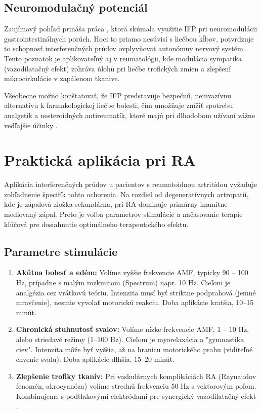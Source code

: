 \subsection{Neuromodulačný potenciál}
Zaujímavý pohľad prináša práca \textcite{Moore2018}, ktorá skúmala využitie IFP pri neuromodulácii gastrointestinálnych porúch. Hoci to priamo nesúvisí s liečbou kĺbov, potvrdzuje to schopnosť interferenčných prúdov ovplyvňovať autonómny nervový systém. Tento poznatok je aplikovateľný aj v reumatológii, kde modulácia sympatika (vazodilatačný efekt) zohráva úlohu pri liečbe trofických zmien a zlepšení mikrocirkulácie v zapálenom tkanive.

Všeobecne možno konštatovať, že IFP predstavuje bezpečnú, neinvazívnu alternatívu k farmakologickej liečbe bolesti, čím umožňuje znížiť spotrebu analgetík a nesteroidných antireumatík, ktoré majú pri dlhodobom užívaní vážne vedľajšie účinky \parencite{Goats1990}.

\section{Praktická aplikácia pri RA}

Aplikácia interferenčných prúdov u pacientov s reumatoidnou artritídou vyžaduje zohľadnenie špecifík tohto ochorenia. Na rozdiel od degeneratívnych artropatií, kde je zápalová zložka sekundárna, pri RA dominuje primárny imunitne mediovaný zápal. Preto je voľba parametrov stimulácie a načasovanie terapie kľúčová pre dosiahnutie optimálneho terapeutického efektu.

\subsection{Parametre stimulácie}
\begin{enumerate}
    \item \textbf{Akútna bolesť a edém:}
    Volíme vyššie frekvencie AMF, typicky 90 – 100 Hz, prípadne s malým rozkmitom (Spectrum) napr. 10 Hz. Cieľom je analgézia cez vrátkovú teóriu. Intenzita musí byť striktne podprahová (jemné mravčenie), nesmie vyvolať motorickú reakciu. Doba aplikácie kratšia, 10–15 minút.
    \item \textbf{Chronická stuhnutosť svalov:}
    Volíme nízke frekvencie AMF, 1 – 10 Hz, alebo striedavé režimy (1–100 Hz). Cieľom je myorelaxácia a "gymnastika ciev". Intenzita môže byť vyššia, až na hranicu motorického prahu (viditeľné chvenie svalu). Doba aplikácie dlhšia, 15–20 minút.
    \item \textbf{Zlepšenie trofiky tkanív:}
    Pri vaskulárnych komplikáciách RA (Raynaudov fenomén, akrocyanóza) volíme strednú frekvenciu 50 Hz s vektorovým poľom. Kombinujeme s podtlakovými elektródami pre synergický vazodilatačný efekt \parencite{Capko2010}.
\end{enumerate}

